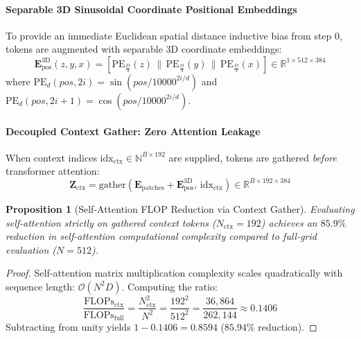 \documentclass{article}
\newtheorem{proposition}{Proposition}
\begin{document}
\paragraph{Separable 3D Sinusoidal Coordinate Positional Embeddings}
To provide an immediate Euclidean spatial distance inductive bias from step 0, tokens are augmented with separable 3D coordinate embeddings:
\begin{equation}
    \mathbf{E}_{\text{pos}}^{3\text{D}}(z, y, x) = \left[ \text{PE}_{\frac{D}{3}}(z) \,\|\, \text{PE}_{\frac{D}{3}}(y) \,\|\, \text{PE}_{\frac{D}{3}}(x) \right] \in \mathbb{R}^{1 \times 512 \times 384}
\end{equation}
where $\text{PE}_{d}(pos, 2i) = \sin(pos / 10000^{2i/d})$ and $\text{PE}_{d}(pos, 2i+1) = \cos(pos / 10000^{2i/d})$.

\paragraph{Decoupled Context Gather: Zero Attention Leakage}
When context indices $\text{idx}_{\text{ctx}} \in \mathbb{N}^{B \times 192}$ are supplied, tokens are gathered \emph{before} transformer attention:
\begin{equation}
    \mathbf{Z}_{\text{ctx}} = \text{gather}(\mathbf{E}_{\text{patches}} + \mathbf{E}_{\text{pos}}^{3\text{D}}, \, \text{idx}_{\text{ctx}}) \in \mathbb{R}^{B \times 192 \times 384}
\end{equation}

\begin{proposition}[Self-Attention FLOP Reduction via Context Gather]
\label{prop:flop_reduction}
Evaluating self-attention strictly on gathered context tokens ($N_{\text{ctx}} = 192$) achieves an $85.9\%$ reduction in self-attention computational complexity compared to full-grid evaluation ($N = 512$).
\end{proposition}

\begin{proof}
Self-attention matrix multiplication complexity scales quadratically with sequence length: $\mathcal{O}(N^2 D)$. Computing the ratio:
\begin{equation}
    \frac{\text{FLOPs}_{\text{ctx}}}{\text{FLOPs}_{\text{full}}} = \frac{N_{\text{ctx}}^2}{N^2} = \frac{192^2}{512^2} = \frac{36,864}{262,144} \approx 0.1406
\end{equation}
Subtracting from unity yields $1 - 0.1406 = 0.8594$ ($85.94\%$ reduction).
\end{proof}
\end{document}
